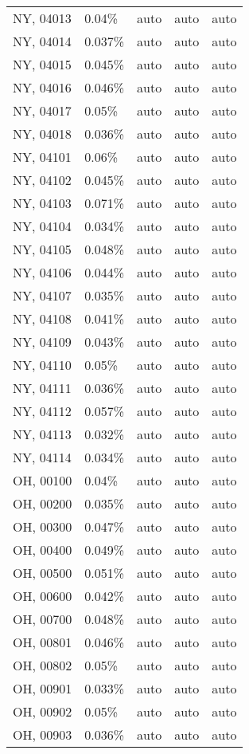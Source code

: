 \begin{longtable}[]{@{}lllll@{}}
NY, 04013 & 0.04\% & auto & auto & auto \\
NY, 04014 & 0.037\% & auto & auto & auto \\
NY, 04015 & 0.045\% & auto & auto & auto \\
NY, 04016 & 0.046\% & auto & auto & auto \\
NY, 04017 & 0.05\% & auto & auto & auto \\
NY, 04018 & 0.036\% & auto & auto & auto \\
NY, 04101 & 0.06\% & auto & auto & auto \\
NY, 04102 & 0.045\% & auto & auto & auto \\
NY, 04103 & 0.071\% & auto & auto & auto \\
NY, 04104 & 0.034\% & auto & auto & auto \\
NY, 04105 & 0.048\% & auto & auto & auto \\
NY, 04106 & 0.044\% & auto & auto & auto \\
NY, 04107 & 0.035\% & auto & auto & auto \\
NY, 04108 & 0.041\% & auto & auto & auto \\
NY, 04109 & 0.043\% & auto & auto & auto \\
NY, 04110 & 0.05\% & auto & auto & auto \\
NY, 04111 & 0.036\% & auto & auto & auto \\
NY, 04112 & 0.057\% & auto & auto & auto \\
NY, 04113 & 0.032\% & auto & auto & auto \\
NY, 04114 & 0.034\% & auto & auto & auto \\
OH, 00100 & 0.04\% & auto & auto & auto \\
OH, 00200 & 0.035\% & auto & auto & auto \\
OH, 00300 & 0.047\% & auto & auto & auto \\
OH, 00400 & 0.049\% & auto & auto & auto \\
OH, 00500 & 0.051\% & auto & auto & auto \\
OH, 00600 & 0.042\% & auto & auto & auto \\
OH, 00700 & 0.048\% & auto & auto & auto \\
OH, 00801 & 0.046\% & auto & auto & auto \\
OH, 00802 & 0.05\% & auto & auto & auto \\
OH, 00901 & 0.033\% & auto & auto & auto \\
OH, 00902 & 0.05\% & auto & auto & auto \\
OH, 00903 & 0.036\% & auto & auto & auto \\

\end{longtable}
